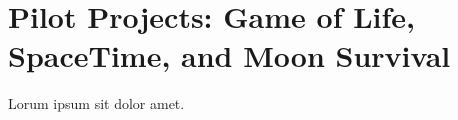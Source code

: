 \section{Pilot Projects: Game of Life, SpaceTime, and Moon Survival}


Lorum ipsum sit dolor amet.  \lipsum[2-4]
